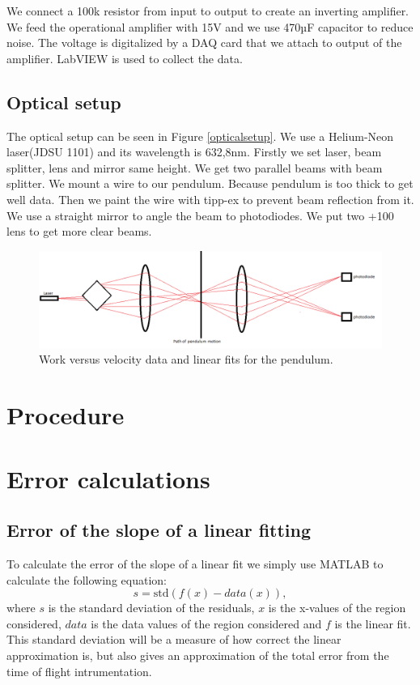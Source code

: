 \documentclass[11pt, a4paper]{article}
\begin{document}
We connect a 100k resistor from input to output to create an inverting amplifier. We feed the operational amplifier with 15V and we use 470µF capacitor to reduce noise. The voltage is digitalized by a DAQ card that we attach to output of the amplifier. LabVIEW is used to collect the data.

\subsection{Optical setup}
The optical setup can be seen in Figure \ref{opticalsetup}. We use a Helium-Neon  laser(JDSU 1101) and its wavelength is 632,8nm. Firstly we set laser, beam splitter, lens and mirror same height. We get two parallel beams with beam splitter. 
We mount a wire to our pendulum. Because pendulum is too thick to get well data. Then we paint the wire with tipp-ex to prevent beam reflection from it. We use a straight mirror to angle the beam to photodiodes. We put two +100 lens to get more clear beams.

\begin{figure}[h]
	\centering
	\includegraphics[scale=0.4]{opticalsetup2}
	\caption{Work versus velocity data and  linear fits for the pendulum.}
	\label{f:opticalsetup}
\end{figure}

\section{Procedure}

\section{Error calculations}

\subsection{Error of the slope of a linear fitting}
To calculate the error of the slope of a linear fit we simply use MATLAB to calculate the following equation:
\begin{equation}
	s = \text{std}(f(x)-data(x)),
	\label{e:std}
\end{equation}
where $s$ is the standard deviation of the residuals, $x$ is the x-values of the region considered, 
$data$ is the data values of the region considered and $f$ is the linear fit.
This standard deviation will be a measure of how correct the linear approximation is, 
but also gives an approximation of the total error from the time of flight intrumentation.
\end{document}
